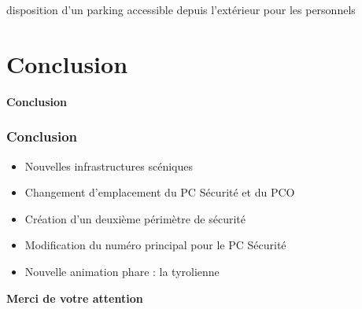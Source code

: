 \documentclass[xcolor=table]{beamer}
\begin{document}
\begin{frame}
\begin{itemize}
disposition d’un parking accessible depuis l’extérieur pour les personnels
\end{itemize}

\end{frame}

\section{Conclusion}

\begin{frame}

\centering\Huge{\textbf{Conclusion}}

\end{frame}

\begin{frame}

\frametitle{Conclusion}
\begin{itemize}
\item Nouvelles infrastructures scéniques
\vspace{2mm}
\item Changement d'emplacement du PC Sécurité et du PCO
\vspace{2mm}
\item Création d'un deuxième périmètre de sécurité
\vspace{2mm}
\item Modification du numéro principal pour le PC Sécurité
\vspace{2mm}
\item Nouvelle animation phare : la tyrolienne
\end{itemize}

\end{frame}

\begin{frame}
\centering\huge{\textbf{Merci de votre attention}}
\vspace{1cm}
\begin{Parallel}{.5\textwidth}{.5\textwidth}
\end{Parallel}

\end{frame}
\end{document}
